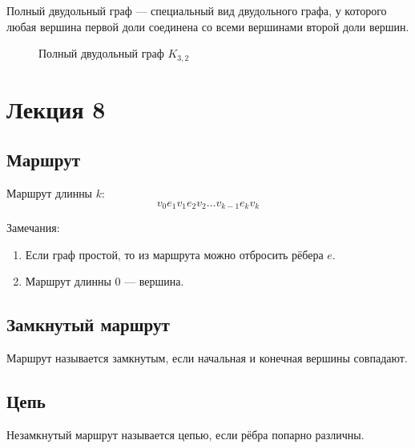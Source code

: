 \documentclass[a4paper,12pt]{article} %
\begin{document}
    Полный двудольный граф --- специальный вид двудольного графа, у которого любая вершина первой доли соединена со всеми вершинами второй доли вершин. 
    \begin{figure}[H]
        \centering	
        \caption*{Полный двудольный граф $K_{3,2}$}
    \end{figure}

\clearpage
\section{Лекция 8}

\subsection{Маршрут}

Маршрут длинны $k$:
$$ v_0 e_1 v_1 e_2 v_2 \dots v_{k-1} e_k v_k $$

Замечания:
\begin{enumerate}
\item Если граф простой, то из маршрута можно отбросить рёбера $e$.
\item Маршрут длинны 0 --- вершина.
\end{enumerate}

\subsection{Замкнутый маршрут}

Маршрут называется замкнутым, если начальная и конечная вершины совпадают.

\subsection{Цепь}
Незамкнутый маршрут называется цепью, если рёбра попарно различны.
\end{document}

